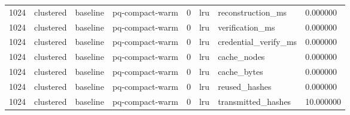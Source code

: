 \begin{tabular}{llllllll}
1024 & clustered & baseline & pq-compact-warm & 0 & lru & reconstruction\_ms & 0.000000 \\
1024 & clustered & baseline & pq-compact-warm & 0 & lru & verification\_ms & 0.000000 \\
1024 & clustered & baseline & pq-compact-warm & 0 & lru & credential\_verify\_ms & 0.000000 \\
1024 & clustered & baseline & pq-compact-warm & 0 & lru & cache\_nodes & 0.000000 \\
1024 & clustered & baseline & pq-compact-warm & 0 & lru & cache\_bytes & 0.000000 \\
1024 & clustered & baseline & pq-compact-warm & 0 & lru & reused\_hashes & 0.000000 \\
1024 & clustered & baseline & pq-compact-warm & 0 & lru & transmitted\_hashes & 10.000000 \\
\end{tabular}
